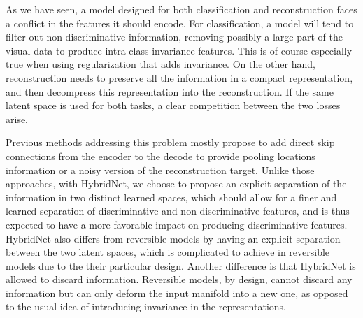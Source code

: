 As we have seen, a model designed for both classification and reconstruction faces a conflict in the features it should encode. For classification, a model will tend to filter out non-discriminative information, removing possibly a large part of the visual data to produce intra-class invariance features. This is of course especially true when using regularization that adds invariance. On the other hand, reconstruction needs to preserve all the information in a compact representation, and then decompress this representation into the reconstruction. If the same latent space is used for both tasks, a clear competition between the two losses arise.

Previous methods addressing this problem \citep{Rasmus2015,Zhao2016a,Zhang2016a} mostly propose to add direct skip connections from the encoder to the decode to provide pooling locations information or a noisy version of the reconstruction target. Unlike those approaches, with HybridNet, we choose to propose an explicit separation of the information in two distinct learned spaces, which should allow for a finer and learned separation of discriminative and non-discriminative features, and is thus expected to have a more favorable impact on producing discriminative features. HybridNet also differs from reversible models \citep{NIPS2017_6816,jacobsen:hal-01712808} by having an explicit separation between the two latent spaces, which is complicated to achieve in reversible models due to the their particular design. Another difference is that HybridNet is allowed to discard information. Reversible models, by design, cannot discard any information but can only deform the input manifold into a new one, as opposed to the usual idea of introducing invariance in the representations.

